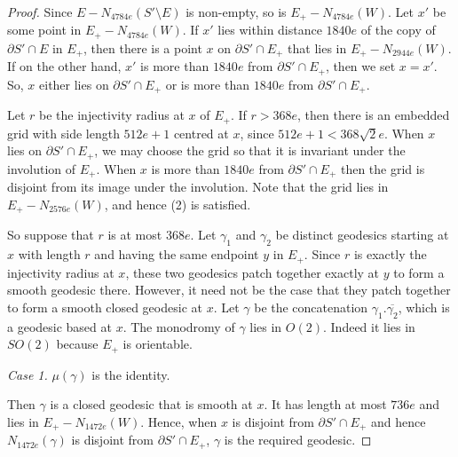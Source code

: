 \documentclass[oneside]{amsart}
\numberwithin{equation}{section}
\theoremstyle{plain}
\theoremstyle{definition}
\begin{document}
\begin{proof}
Since $E - N_{4784e}(S' \setminus E)$ is non-empty, so is $E_+ - N_{4784e}(W)$.
Let $x'$ be some point in $E_+ - N_{4784e}(W)$. If $x'$ lies within distance $1840e$ of the copy of $\partial S' \cap E$ in $E_+$, then
there is a point $x$ on $\partial S' \cap E_+$ that lies in $E_+ - N_{2944e}(W)$. If on the other hand, $x'$
is more than $1840e$ from $\partial S' \cap E_+$, then we set $x = x'$. So, $x$ either lies on $\partial S' \cap E_+$
or is more than $1840e$ from $\partial S' \cap E_+$.

Let $r$ be the injectivity
radius at $x$ of $E_+$. If $r > 368e$, then there is an embedded grid with side
length $512e+1$ centred at $x$, since $512e+1<368\sqrt{2} e$. When $x$ lies on $\partial S' \cap E_+$, we may choose the grid
so that it is invariant under the involution of $E_+$. When $x$ is more than $1840e$
from $\partial S' \cap E_+$ then the grid is disjoint from its image under the involution.
Note that the grid lies in $E_+ - N_{2576e}(W)$, and hence (2) is satisfied.

So suppose that $r$ is at most $368e$. Let $\gamma_1$ and
$\gamma_2$ be distinct geodesics starting at $x$ with length $r$ and having the same endpoint $y$ in $E_+$.
Since $r$ is exactly the injectivity radius at $x$, these two geodesics patch together exactly
at $y$ to form a smooth geodesic there. However, it need not be the case that
they patch together to form a smooth closed geodesic at $x$. Let $\gamma$
be the concatenation $\gamma_1.\overline{\gamma_2}$, which is a geodesic based at $x$.
The monodromy of $\gamma$ lies in $O(2)$. Indeed it lies in $SO(2)$ because $E_+$ is orientable.

\medskip
\emph{Case 1.} $\mu(\gamma)$ is the identity.

Then $\gamma$ is a closed geodesic that is smooth at $x$. It has length at most $736e$ and lies in $E_+ - N_{1472e}(W)$.
Hence, when $x$ is disjoint from $\partial S' \cap E_+$ and hence $N_{1472e}(\gamma)$ is disjoint from $\partial S' \cap E_+$,
$\gamma$ is the required geodesic.


\end{proof}
\end{document}
